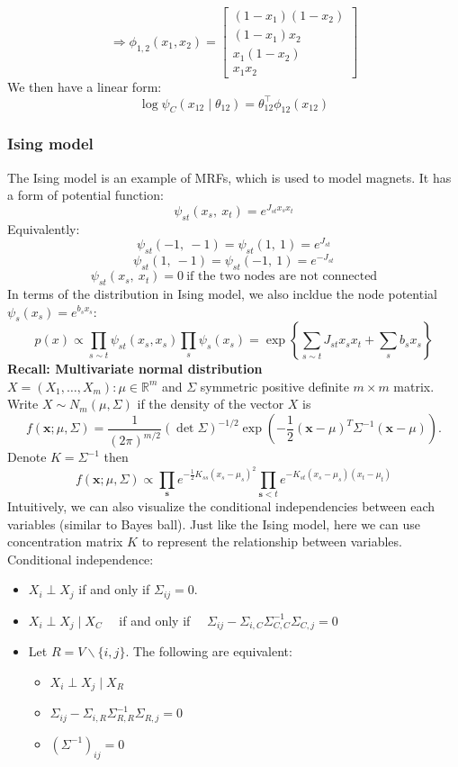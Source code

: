 $$\Rightarrow\phi_{1,2}\left(x_1, x_2\right)=\left[\begin{array}{c}
  \left(1-x_1\right)\left(1-x_2\right) \\
  \left(1-x_1\right) x_2 \\
  x_1\left(1-x_2\right) \\
  x_1 x_2
  \end{array}\right]
$$
We then have a linear form:$$
\log \psi_C\left(x_{12} \mid \theta_{12}\right)=\theta_{12}^{\top} \phi_{12}\left(x_{12}\right)
$$
\subsubsection*{Ising model}
The Ising model is an example of MRFs, which is used to model magnets. It has a form of potential function:
$$\psi_{st}(x_s,\:x_t)=e^{J_{st}x_sx_t}$$
Equivalently:
$$\psi_{st}(-1,\:-1)=\psi_{st}(1,\:1)=e^{J_{st}}$$
$$\psi_{st}(1,\:-1)=\psi_{st}(-1,\:1)=e^{-J_{st}}$$
$$\psi_{st}(x_s,\:x_t)=0\:\text{if the two nodes are not connected}$$
In terms of the distribution in Ising model, we also incldue the node potential $\psi_s(x_s)=e^{b_sx_s}$:
$$p(x) \propto \prod_{s \sim t} \psi_{s t}\left(x_s, x_s\right) \prod_s \psi_s\left(x_s\right)=\exp \left\{\sum_{s \sim t} J_{s t} x_s x_t+\sum_s b_s x_s\right\}$$
\textbf{Recall: Multivariate normal distribution}\\
$X=\left(X_1, \ldots, X_m\right): \mu \in \mathbb{R}^m$ and $\Sigma$ symmetric positive definite $m \times m$ matrix. Write $X \sim N_m(\mu, \Sigma)$ if the density of the vector $X$ is
$$
f(\boldsymbol{x} ; \mu, \Sigma)=\frac{1}{(2 \pi)^{m / 2}}(\operatorname{det} \Sigma)^{-1 / 2} \exp \left(-\frac{1}{2}(\boldsymbol{x}-\mu)^T \Sigma^{-1}(\boldsymbol{x}-\mu)\right) .
$$
Denote $K=\Sigma^{-1}$ then
$$
f(\boldsymbol{x} ; \mu, \Sigma) \propto \prod_{\boldsymbol{s}} e^{-\frac{1}{2} K_{s s}\left(x_s-\mu_s\right)^2} \prod_{\boldsymbol{s}<t} e^{-K_{s t}\left(x_s-\mu_s\right)\left(x_t-\mu_t\right)}
$$
Intuitively, we can also visualize the conditional independencies between each variables (similar to Bayes ball). Just like the Ising model, here we can use concentration matrix $K$ to represent the relationship between variables.\\
Conditional independence:
\begin{itemize}
  \item $X_i \perp X_j$ if and only if $\Sigma_{i j}=0$.
  \item $X_i \perp X_j \mid X_C \quad$ if and only if $\quad \Sigma_{i j}-\Sigma_{i, C} \Sigma_{C, C}^{-1} \Sigma_{C, j}=0$
  \item Let $R=V \backslash\{i, j\}$. The following are equivalent:
  \begin{itemize}
    \item $X_i \perp X_j \mid X_R$
  \item $\Sigma_{i j}-\Sigma_{i, R} \Sigma_{R, R}^{-1} \Sigma_{R, j}=0$
  \item $\left(\Sigma^{-1}\right)_{i j}=0$ 
  \end{itemize}
\end{itemize}

